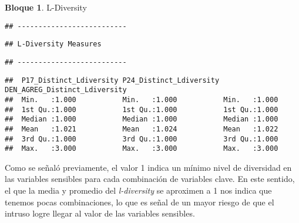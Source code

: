 \documentclass[
]{book}
\newenvironment{Shaded}{\begin{snugshade}}{\end{snugshade}}
\newcommand{\AttributeTok}[1]{\textcolor[rgb]{0.77,0.63,0.00}{#1}}
\newcommand{\CommentTok}[1]{\textcolor[rgb]{0.56,0.35,0.01}{\textit{#1}}}
\newcommand{\ConstantTok}[1]{\textcolor[rgb]{0.00,0.00,0.00}{#1}}
\newcommand{\DecValTok}[1]{\textcolor[rgb]{0.00,0.00,0.81}{#1}}
\newcommand{\FunctionTok}[1]{\textcolor[rgb]{0.00,0.00,0.00}{#1}}
\newcommand{\NormalTok}[1]{#1}
\newcommand{\OtherTok}[1]{\textcolor[rgb]{0.56,0.35,0.01}{#1}}
\newcommand{\SpecialCharTok}[1]{\textcolor[rgb]{0.00,0.00,0.00}{#1}}
\theoremstyle{definition}
\theoremstyle{definition}
\newtheorem{example}{Bloque}[chapter]
\theoremstyle{definition}
\theoremstyle{definition}
\theoremstyle{remark}
\begin{document}
\begin{example}
\protect\hypertarget{exm:bloque52nbm}{}\label{exm:bloque52nbm}L-Diversity
\end{example}

\begin{Shaded}
\end{Shaded}

\begin{verbatim}
## --------------------------
\end{verbatim}

\begin{verbatim}
## L-Diversity Measures
\end{verbatim}

\begin{verbatim}
## --------------------------
\end{verbatim}

\begin{verbatim}
##  P17_Distinct_Ldiversity P24_Distinct_Ldiversity DEN_AGREG_Distinct_Ldiversity
##  Min.   :1.000           Min.   :1.000           Min.   :1.000                
##  1st Qu.:1.000           1st Qu.:1.000           1st Qu.:1.000                
##  Median :1.000           Median :1.000           Median :1.000                
##  Mean   :1.021           Mean   :1.024           Mean   :1.022                
##  3rd Qu.:1.000           3rd Qu.:1.000           3rd Qu.:1.000                
##  Max.   :3.000           Max.   :3.000           Max.   :3.000
\end{verbatim}

Como se señaló previamente, el valor 1 indica un mínimo nivel de diversidad en las variables sensibles para cada
combinación de variables clave. En este sentido, el que la media y promedio del \emph{l-diversity} se aproximen a 1 nos indica que tenemos pocas combinaciones, lo que es señal de un mayor riesgo de que el intruso logre llegar al valor de las variables sensibles.
\end{document}
